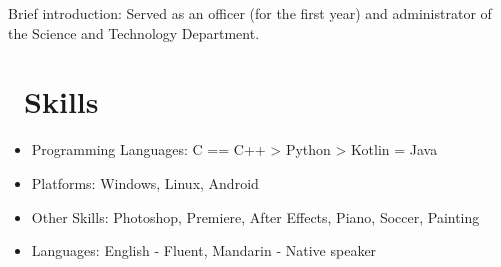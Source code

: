 \documentclass[12pt]{resume}
\begin{document}
Brief introduction: Served as an officer (for the first year) and administrator of the Science and Technology Department.

\section{\texorpdfstring{\textbf{\faGears}\ Skills}{Skills}}
\begin{itemize}[parsep=0.5ex]
  \item Programming Languages: C == C++ > Python > Kotlin = Java
  \item Platforms: Windows, Linux, Android
  \item Other Skills: Photoshop, Premiere, After Effects, Piano, Soccer, Painting
  \item Languages: English - Fluent, Mandarin - Native speaker
\end{itemize}

%   

%
%
\end{document}
